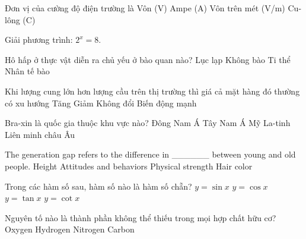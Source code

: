 \begin{ex}
    Đơn vị của cường độ điện trường là
    \choice
    {Vôn (V)}
    {Ampe (A)}
    {\True Vôn trên mét (V/m)}
    {Cu-lông (C)}

\end{ex}
\begin{ex}
    Giải phương trình: $2^x = 8$.
\end{ex}
\begin{ex}
    Hô hấp ở thực vật diễn ra chủ yếu ở bào quan nào?
    \choice
    {Lục lạp}
    {Không bào}
    {\True Ti thể}
    {Nhân tế bào}

\end{ex}
\begin{ex}
    Khi lượng cung lớn hơn lượng cầu trên thị trường thì giá cả mặt hàng đó thường có xu hướng
    \choice
    {Tăng}
    {\True Giảm}
    {Không đổi}
    {Biến động mạnh}

\end{ex}
\begin{ex}
    Bra-xin là quốc gia thuộc khu vực nào?
    \choice
    {Đông Nam Á}
    {Tây Nam Á}
    {\True Mỹ La-tinh}
    {Liên minh châu Âu}

\end{ex}
\begin{ex}
    The generation gap refers to the difference in ______ between young and old people.
    \choice
    {Height}
    {\True Attitudes and behaviors}
    {Physical strength}
    {Hair color}

\end{ex}
\begin{ex}
    Trong các hàm số sau, hàm số nào là hàm số chẵn?
    \choice
    {$y = \sin x$}
    {\True $y = \cos x$}
    {$y = \tan x$}
    {$y = \cot x$}

\end{ex}
\begin{ex}
    Nguyên tố nào là thành phần không thể thiếu trong mọi hợp chất hữu cơ?
    \choice
    {Oxygen}
    {Hydrogen}
    {Nitrogen}
    {\True Carbon}

\end{ex}
